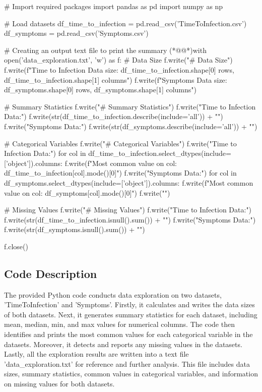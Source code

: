 \documentclass[11pt]{article}
\begin{document}
\begin{python}

# Import required packages
import pandas as pd
import numpy as np

# Load datasets
df_time_to_infection = pd.read_csv('TimeToInfection.csv')
df_symptoms = pd.read_csv('Symptoms.csv')

# Creating an output text file to print the summary
(*@@*)with open('data_exploration.txt', 'w') as f:
    # Data Size
    f.write("# Data Size\n")
    f.write(f"Time to Infection Data size: {df_time_to_infection.shape[0]} rows, {df_time_to_infection.shape[1]} columns\n")
    f.write(f"Symptoms Data size: {df_symptoms.shape[0]} rows, {df_symptoms.shape[1]} columns\n\n")

    # Summary Statistics
    f.write("# Summary Statistics\n")
    f.write("Time to Infection Data:\n")
    f.write(str(df_time_to_infection.describe(include='all')) + "\n\n")
    f.write("Symptoms Data:\n")
    f.write(str(df_symptoms.describe(include='all')) + "\n\n")
    
    # Categorical Variables
    f.write("# Categorical Variables\n")
    f.write("Time to Infection Data:\n")
    for col in df_time_to_infection.select_dtypes(include=['object']).columns:
        f.write(f"Most common value on {col}: {df_time_to_infection[col].mode()[0]}\n")
    f.write("Symptoms Data:\n")
    for col in df_symptoms.select_dtypes(include=['object']).columns:
        f.write(f"Most common value on {col}: {df_symptoms[col].mode()[0]}\n")
    f.write("\n")

    # Missing Values
    f.write("# Missing Values\n")
    f.write("Time to Infection Data:\n")
    f.write(str(df_time_to_infection.isnull().sum()) + "\n")
    f.write("Symptoms Data:\n")
    f.write(str(df_symptoms.isnull().sum()) + "\n\n")
    
f.close()

\end{python}

\subsection{Code Description}

The provided Python code conducts data exploration on two datasets, 'TimeToInfection' and 'Symptoms'. Firstly, it calculates and writes the data sizes of both datasets. Next, it generates summary statistics for each dataset, including mean, median, min, and max values for numerical columns. The code then identifies and prints the most common values for each categorical variable in the datasets. Moreover, it detects and reports any missing values in the datasets. Lastly, all the exploration results are written into a text file 'data\_exploration.txt' for reference and further analysis. This file includes data sizes, summary statistics, common values in categorical variables, and information on missing values for both datasets.
\end{document}
